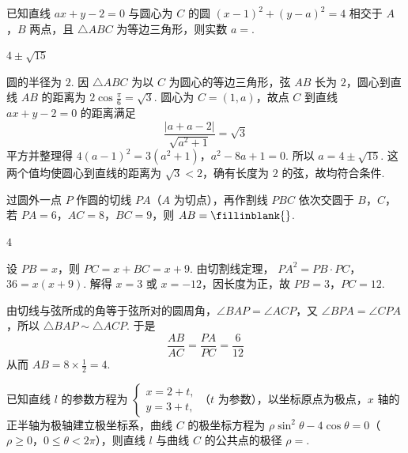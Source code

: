 \begin{problem}
已知直线 \(ax + y - 2 = 0\) 与圆心为 \(C\) 的圆 \((x - 1)^2 + (y - a)^2 = 4\) 相交于 \(A\)，\(B\) 两点，且 \(\triangle ABC\) 为等边三角形，则实数 \(a = \)\fillinblank{}.
\end{problem}

\begin{answer}
\(4 \pm \sqrt{15}\)
\end{answer}

\begin{solution}
圆的半径为 \(2\). 因 \(\triangle ABC\) 为以 \(C\) 为圆心的等边三角形，弦 \(AB\) 长为 \(2\)，圆心到直线 \(AB\) 的距离为
\(2\cos\frac{\pi}{6}=\sqrt3\). 圆心为 \(C=(1,a)\)，故点 \(C\) 到直线 \(ax+y-2=0\) 的距离满足
\[
\frac{|a+a-2|}{\sqrt{a^{2}+1}}=\sqrt3
\]
平方并整理得
\(4(a-1)^{2}=3(a^{2}+1)\)，\(a^{2}-8a+1=0\).
所以 \(a=4\pm\sqrt{15}\). 这两个值均使圆心到直线的距离为 \(\sqrt3<2\)，确有长度为 \(2\) 的弦，故均符合条件.
\end{solution}

\begin{problem}
过圆外一点 \(P\) 作圆的切线 \(PA\)（\(A\) 为切点），再作割线 \(PBC\) 依次交圆于 \(B\)，\(C\)，若 \(PA = 6\)，\(AC = 8\)，\(BC = 9\)，则 \(AB =\fillinblank{}\).
\end{problem}

\begin{answer}
\(4\)
\end{answer}

\begin{solution}
设 \(PB=x\)，则 \(PC=x+BC=x+9\). 由切割线定理，
\(PA^{2}=PB\cdot PC\)，\(36=x(x+9)\).
解得 \(x=3\) 或 \(x=-12\)，因长度为正，故 \(PB=3\)，\(PC=12\).

由切线与弦所成的角等于弦所对的圆周角，\(\angle BAP=\angle ACP\)，又 \(\angle BPA=\angle CPA\)，所以 \(\triangle BAP\sim\triangle ACP\). 于是
\[
\frac{AB}{AC}=\frac{PA}{PC}=\frac{6}{12}
\]
从而 \(AB=8\times\frac12=4\).
\end{solution}

\begin{problem}
已知直线 \(l\) 的参数方程为 \( \begin{cases}
x=2+t,\\
y=3+t,
\end{cases} \)（\(t\) 为参数），以坐标原点为极点，\(x\) 轴的正半轴为极轴建立极坐标系，曲线 \(C\) 的极坐标方程为 \( \rho\sin^{2}\theta-4\cos\theta=0 \)（\(\rho\geqslant0\)，\(0\leqslant\theta<2\pi\)），则直线 \(l\) 与曲线 \(C\) 的公共点的极径 \( \rho= \)\fillinblank{}.
\end{problem}


